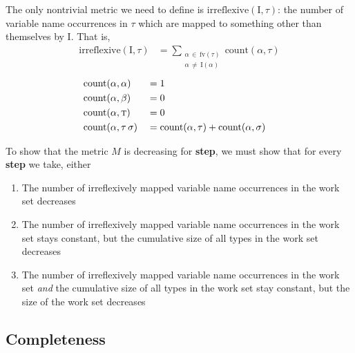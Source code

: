 \documentclass[10pt, letterpaper, oneside]{article}
\newcommand{\inertset}{\text{I}}
\newcommand{\fv}{\mathrm{fv}}
\begin{document}
The only nontrivial metric we need to define is \(\text{irreflexive}(\inertset, \tau)\): the number of variable name occurrences in \(\tau\) which are mapped to something other than themselves by \(\inertset\). That is,
\begin{align*}
  \text{irreflexive}(\inertset, \tau) &= \!\!\!\!\sum_{\substack{\alpha\,\in\,\fv(\tau)\\\alpha\,\ne\,\inertset(\alpha)}}\!\!\!\text{count}(\alpha, \tau)
\end{align*}
\begin{alignat*}{3}
  &\text{count}(\alpha, \alpha) &&= 1 &&\\
  &\text{count}(\alpha, \beta)  &&= 0 &&\\
  &\text{count}(\alpha, \text{\sc t}) &&= 0 &&\\
  &\text{count}(\alpha, \tau\,\sigma) &&= \text{count}(\alpha, \tau) + \text{count}(\alpha, \sigma) &&
\end{alignat*}

To show that the metric \(M\) is decreasing for \textbf{step}, we must show that for every \textbf{step} we take, either
\begin{enumerate}
\item The number of irreflexively mapped variable name occurrences in the work set decreases
\item The number of irreflexively mapped variable name occurrences in the work set stays constant, but the cumulative size of all types in the work set decreases
\item The number of irreflexively mapped variable name occurrences in the work set \emph{and} the cumulative size of all types in the work set stay constant, but the size of the work set decreases
\end{enumerate}


\subsection{Completeness}
\end{document}
